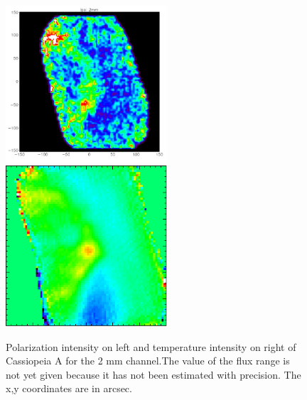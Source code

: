 \documentclass[12pt,a4]{article}
\begin{document}
\begin{figure} [t!]

\includegraphics[width=6cm]{figures/map_casa_ipol.png}
\includegraphics[width=6cm]{figures/map_2mm.png}
\caption{Polarization intensity on left and temperature intensity on right of
  Cassiopeia A for the 2 mm channel.The value of the flux range is not yet given
  because it has not been estimated with precision. The x,y coordinates are in
  arcsec.}
\label{fig:CasA_2mm}


  \end{figure}






\end{document}
